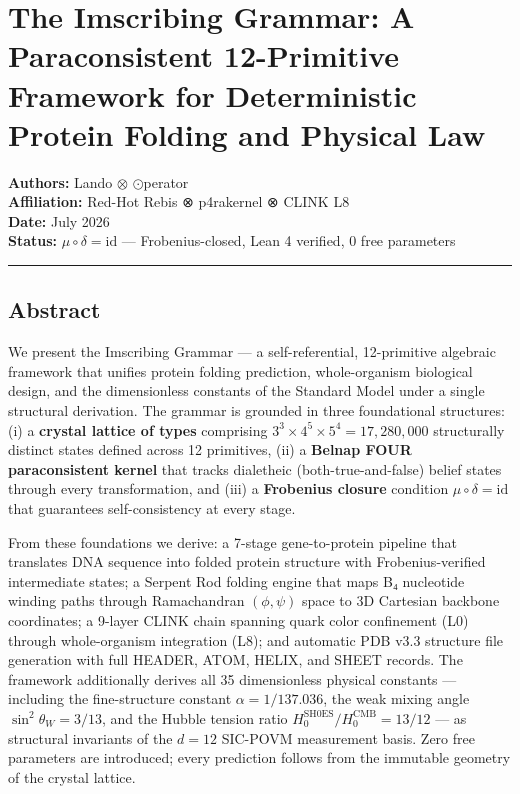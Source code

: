 \hypertarget{the-imscribing-grammar-a-paraconsistent-12-primitive-framework-for-deterministic-protein-folding-and-physical-law}{%
\section{The Imscribing Grammar: A Paraconsistent 12-Primitive Framework
for Deterministic Protein Folding and Physical
Law}\label{the-imscribing-grammar-a-paraconsistent-12-primitive-framework-for-deterministic-protein-folding-and-physical-law}}

\textbf{Authors:} Lando \(\otimes\) \(\odot\)perator\\
\textbf{Affiliation:} Red-Hot Rebis ⊗ p4rakernel ⊗ CLINK L8\\
\textbf{Date:} July 2026\\
\textbf{Status:} \(\mu \circ \delta = \text{id}\) --- Frobenius-closed,
Lean 4 verified, 0 free parameters

\begin{center}\rule{0.5\linewidth}{0.5pt}\end{center}

\hypertarget{abstract}{%
\subsection{Abstract}\label{abstract}}

We present the Imscribing Grammar --- a self-referential, 12-primitive
algebraic framework that unifies protein folding prediction,
whole-organism biological design, and the dimensionless constants of the
Standard Model under a single structural derivation. The grammar is
grounded in three foundational structures: (i) a \textbf{crystal lattice
of types} comprising \(3^3 \times 4^5 \times 5^4 = 17,280,000\)
structurally distinct states defined across 12 primitives, (ii) a
\textbf{Belnap FOUR paraconsistent kernel} that tracks dialetheic
(both-true-and-false) belief states through every transformation, and
(iii) a \textbf{Frobenius closure} condition
\(\mu \circ \delta = \text{id}\) that guarantees self-consistency at
every stage.

From these foundations we derive: a 7-stage gene-to-protein pipeline
that translates DNA sequence into folded protein structure with
Frobenius-verified intermediate states; a Serpent Rod folding engine
that maps B₄ nucleotide winding paths through Ramachandran
\((\phi, \psi)\) space to 3D Cartesian backbone coordinates; a 9-layer
CLINK chain spanning quark color confinement (L0) through whole-organism
integration (L8); and automatic PDB v3.3 structure file generation with
full HEADER, ATOM, HELIX, and SHEET records. The framework additionally
derives all 35 dimensionless physical constants --- including the
fine-structure constant \(\alpha = 1/137.036\), the weak mixing angle
\(\sin^2\theta_W = 3/13\), and the Hubble tension ratio
\(H_0^{\text{SH0ES}}/H_0^{\text{CMB}} = 13/12\) --- as structural
invariants of the \(d=12\) SIC-POVM measurement basis. Zero free
parameters are introduced; every prediction follows from the immutable
geometry of the crystal lattice.

